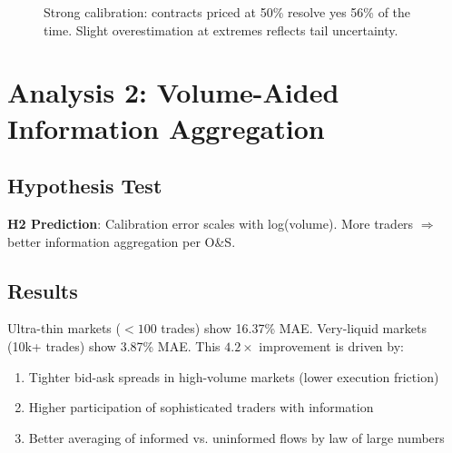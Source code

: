 \documentclass[a4paper,11pt]{article}
\theoremstyle{plain}
\theoremstyle{definition}
\begin{document}
\begin{figure}[h]
\centering
\small
{}
\caption{Strong calibration: contracts priced at 50\% resolve yes 56\% of the time. Slight overestimation at extremes reflects tail uncertainty.}
\label{fig:calibration}
\end{figure}

\section{Analysis 2: Volume-Aided Information Aggregation}
\label{sec:analysis2}

\subsection{Hypothesis Test}

\textbf{H2 Prediction}: Calibration error scales with log(volume). More traders $\Rightarrow$ better information aggregation per O\&S.

\subsection{Results}

Ultra-thin markets ($<100$ trades) show 16.37\% MAE. Very-liquid markets (10k+ trades) show 3.87\% MAE. This $4.2\times$ improvement is driven by:

\begin{enumerate}
\item Tighter bid-ask spreads in high-volume markets (lower execution friction)
\item Higher participation of sophisticated traders with information
\item Better averaging of informed vs. uninformed flows by law of large numbers
\end{enumerate}
\end{document}
